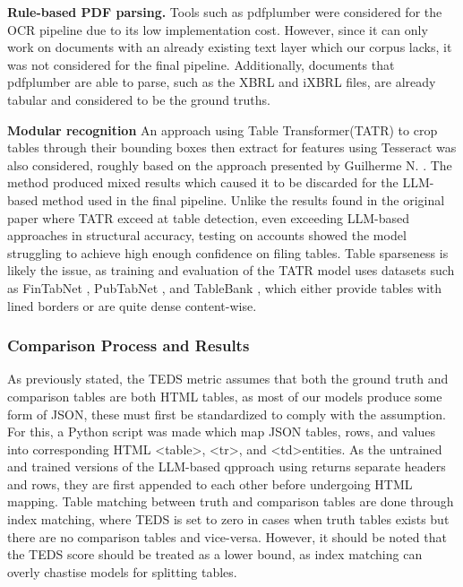 \documentclass[ %
                    author={Natchalin Iwsakul \\[0.4em] Inkaphol Siriwongwattana \\[0.4em] Tanaphan Kummaraphat \\[0.6em] Patorn Srisupap},,
                supervisor={Fernando Moreno-Pino},
                    degree={MSc},
                     title={Propensity Modelling for SME Commercial Lending Using Open Public Data
},
                  subtitle={Companies House and GDELT as predictors of first-time borrowing},
                      type={},
                      year={2026}]{dissertation}
\begin{document}
\textbf{Rule-based PDF parsing.}
Tools such as pdfplumber were considered for the OCR pipeline due to its low implementation cost. However, since it can only work on documents with an already existing text layer which our corpus lacks, it was not considered for the final pipeline. Additionally, documents that pdfplumber are able to parse, such as the XBRL and iXBRL files, are already tabular and considered to be the ground truths.

\textbf{Modular recognition}
An approach using Table Transformer(TATR) \cite{smock2023aligning} to crop tables through their bounding boxes then extract for features using Tesseract was also considered, roughly based on the approach presented by Guilherme N. \cite{benchmarking_LLM_vs_trad}. The method produced mixed results which caused it to be discarded for the LLM-based method used in the final pipeline. Unlike the results found in the original paper where TATR exceed at table detection, even exceeding LLM-based approaches in structural accuracy, testing on accounts showed the model struggling to achieve high enough confidence on filing tables. Table sparseness is likely the issue, as training and evaluation of the TATR model uses datasets such as FinTabNet \cite{smock2023aligning}, PubTabNet \cite{zhong_2020}, and TableBank \cite{li2019tablebank}, which either provide tables with lined borders or are quite dense content-wise.

\subsubsection{Comparison Process and Results}
As previously stated, the TEDS metric assumes that both the ground truth and comparison tables are both HTML tables, as most of our models produce some form of JSON, these must first be standardized to comply with the assumption. For this, a Python script was made which map JSON tables, rows, and values into corresponding HTML \textless table\textgreater , \textless tr\textgreater, and \textless td\textgreater  entities. As the untrained and trained versions of the LLM-based qpproach using returns separate headers and rows, they are first appended to each other before undergoing HTML mapping. Table matching between truth and comparison tables are done through index matching, where TEDS is set to zero in cases when truth tables exists but there are no comparison tables and vice-versa. However, it should be noted that the TEDS score should be treated as a lower bound, as index matching can overly chastise models for splitting tables.
\end{document}

